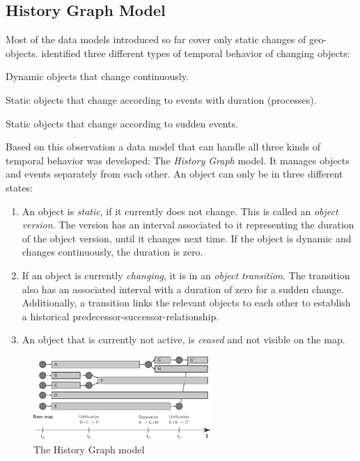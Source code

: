\subsection{History Graph Model} %
\label{sub:history_graph_model}

Most of the data models introduced so far cover only static changes of geo-objects. \cite{renolen96} identified three different types of temporal behavior of changing objects:
\begin{compactitem}
  \item Dynamic objects that change continuously.
  \item Static objects that change according to events with duration (processes).
  \item Static objects that change according to sudden events.
\end{compactitem}

Based on this observation a data model that can handle all three kinds of temporal behavior was developed: The \emph{History Graph} model. It manages objects and events separately from each other. An object can only be in three different states:
\begin{enumerate}
  \item An object is \emph{static}, if it currently does not change. This is called an \emph{object version}. The version has an interval associated to it representing the duration of the object version, until it changes next time. If the object is dynamic and changes continuously, the duration is zero.
  \item If an object is currently \emph{changing}, it is in an \emph{object transition}. The transition also has an associated interval with a duration of zero for a sudden change. Additionally, a transition links the relevant objects to each other to establish a historical predecessor-successor-relationship.
  \item An object that is currently not active, is \emph{ceased} and not visible on the map.
\end{enumerate}

\begin{figure}[H]
  \centering
  \includegraphics[width=0.60\textwidth]{graphics/basics/stdm/history_graph_model}
  \caption{The History Graph model}
  \label{fig:history_graph_model}
\end{figure}

